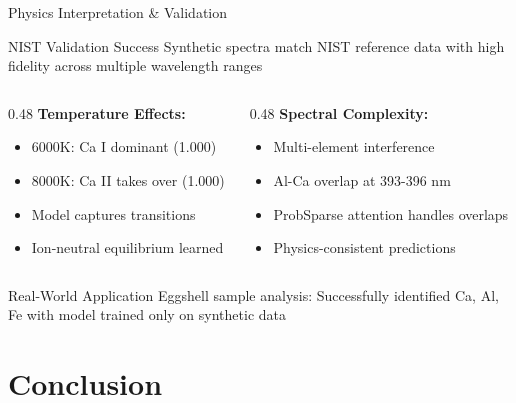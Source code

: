 \documentclass{beamer}
\begin{document}
\begin{frame}{Physics Interpretation \& Validation}
  \begin{block}{NIST Validation Success}
    Synthetic spectra match NIST reference data with high fidelity across multiple wavelength ranges
  \end{block}
  
  \begin{columns}[T]
    \begin{column}{0.48\textwidth}
      \textbf{Temperature Effects:}
      \begin{itemize}
        \item 6000K: Ca I dominant (1.000)
        \item 8000K: Ca II takes over (1.000)
        \item Model captures transitions
        \item Ion-neutral equilibrium learned
      \end{itemize}
    \end{column}
    \begin{column}{0.48\textwidth}
      \textbf{Spectral Complexity:}
      \begin{itemize}
        \item Multi-element interference
        \item Al-Ca overlap at 393-396 nm
        \item ProbSparse attention handles overlaps
        \item Physics-consistent predictions
      \end{itemize}
    \end{column}
  \end{columns}
  
  \vspace{1em}
  \begin{exampleblock}{Real-World Application}
    Eggshell sample analysis: Successfully identified Ca, Al, Fe with model trained only on synthetic data
  \end{exampleblock}
\end{frame}

\section{Conclusion}
\end{document}
